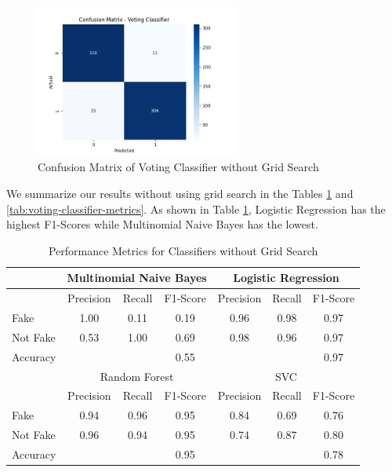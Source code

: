 \begin{figure}[ht]
\centering
\includegraphics[width=0.6\textwidth,height=0.6\textheight, keepaspectratio]{figures/withoutgridsearch/VC.png}
  \caption{Confusion Matrix of Voting Classifier without Grid Search}
  \label{CMofVCwoGS}
\end{figure}

\clearpage

We summarize our results without using grid search in the Tables \ref{tab:classifier-metrics} and \ref{tab:voting-classifier-metrics}. As shown in Table \ref{tab:classifier-metrics}, Logistic Regression has the highest F1-Scores while Multinomial Naive Bayes has the lowest.

\begin{table}[ht]
\centering
\begin{tabular}{|l|ccc|ccc|}
\hline
& \multicolumn{3}{c|}{Multinomial Naive Bayes} & \multicolumn{3}{c|}{Logistic Regression} \\
\hline
& Precision & Recall & F1-Score & Precision & Recall & F1-Score \\
\hline
Fake & 1.00 & 0.11 & 0.19 & 0.96 & 0.98 & 0.97 \\
Not Fake & 0.53 & 1.00 & 0.69 & 0.98 & 0.96 & 0.97 \\
Accuracy & & & 0.55 & & & 0.97 \\
\hline
& \multicolumn{3}{c|}{Random Forest} & \multicolumn{3}{c|}{SVC} \\
\hline
& Precision & Recall & F1-Score & Precision & Recall & F1-Score \\
\hline
Fake & 0.94 & 0.96 & 0.95 & 0.84 & 0.69 & 0.76 \\
Not Fake & 0.96 & 0.94 & 0.95 & 0.74 & 0.87 & 0.80 \\
Accuracy & & & 0.95 & & & 0.78 \\
\hline
\end{tabular}
\caption{Performance Metrics for Classifiers without Grid Search}
\label{tab:classifier-metrics}
\end{table}


